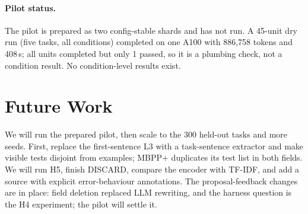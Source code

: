 \documentclass{article}
\begin{document}
\paragraph{Pilot status.}
The pilot is prepared as two config-stable shards and has not run. A 45-unit dry run (five tasks, all
conditions) completed on one A100 with 886{,}758 tokens and 408\,s; all units completed but
only 1 passed, so it is a plumbing check, not a condition result. No condition-level results
exist.

\section{Future Work}

We will run the prepared pilot, then scale to the 300 held-out tasks and more seeds. First,
replace the first-sentence L3 with a task-sentence extractor and make visible tests disjoint from
examples; MBPP+ duplicates its test list in both fields. We will run H5, finish DISCARD, compare
the encoder with TF-IDF, and add a source with explicit error-behaviour annotations. The
proposal-feedback changes are in place: field deletion replaced LLM rewriting, and the harness
question is the H4 experiment; the pilot will settle it.



\end{document}
